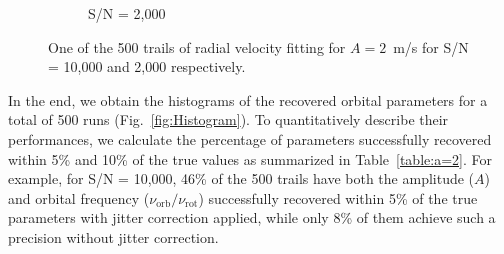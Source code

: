 \begin{figure}[tbp]
\begin{subfigure}[b]{1.0\textwidth}
\begin{subfigure}[b]{0.49\textwidth}
        	\end{subfigure}
        	\caption{S/N = 2,000}
    \end{subfigure}	       
    \caption[Planet recovery ($A = 2$~m/s)]
    {One of the 500 trails of radial velocity fitting for $A = 2$~m/s for S/N = 10,000 and 2,000 respectively.}
\label{fig:Planet_recovery_p2}
\end{figure}    

In the end, we obtain the histograms of the recovered orbital parameters for a total of 500 runs (Fig.~\ref{fig:Histogram}). To quantitatively describe their performances, we calculate the percentage of parameters successfully recovered within 5\% and 10\% of the true values as summarized in Table~\ref{table:a=2}. For example, for S/N = 10,000, 46\% of the 500 trails have both the amplitude ($A$) and orbital frequency ($\nu_\text{orb}/\nu_\text{rot}$) successfully recovered within 5\% of the true parameters with jitter correction applied, while only 8\% of them achieve such a precision without jitter correction. 


